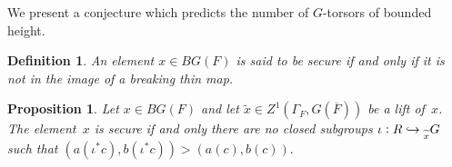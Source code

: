 \documentclass[a4paper,english,12pt]{amsart}
\newcommand{\QQ}{\mathbb{Q}}
\newcommand{\oF}{\overline F}
\newtheorem{mydef}[equation]{Definition}
\newtheorem{prop}[equation]{Proposition}
\numberwithin{equation}{subsection}
\begin{document}
\subsubsection{}We present a conjecture which predicts the number of $G$-torsors of bounded height. %
\begin{mydef} %
An element $x\in BG(F)$ is said to be secure if and only if it is not in the image of a breaking thin map. %
\end{mydef}
\begin{prop}\label{usefulcriterion}
Let $x\in BG(F)$ and let $\widetilde x\in Z^1(\Gamma_F, G(\oF))$ be a lift of~$x$. The element~$x$ is secure if and only there are no closed subgroups $\iota:R\hookrightarrow \prescript{}{\widetilde x}G$ such that $(a(\iota^*c), b(\iota^*c))> (a(c), b(c)).$ 
\end{prop}
\end{document}
